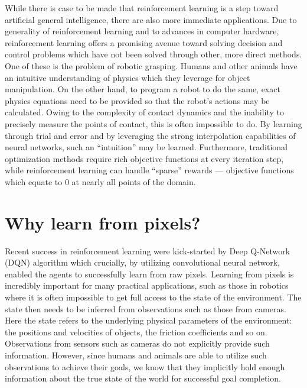 While there is case to be made that reinforcement learning is a step toward
artificial general intelligence, there are also more immediate applications.
Due to generality of reinforcement learning and to advances in computer hardware,
reinforcement learning offers a promising avenue toward solving decision and
control problems which have not been solved through other, more direct methods.
One of these is the problem of robotic grasping.
Humans and other animals have an intuitive understanding of physics which they
leverage for object manipulation.
On the other hand, to program a robot to do the same, exact
physics equations need to be provided so that the robot's actions may be calculated.
Owing to the complexity of contact dynamics and the inability to precisely
measure the points of contact, this is often impossible to do.
By learning through trial and error and by leveraging the strong interpolation
capabilities of neural networks, such an ``intuition'' may be learned.
Furthermore, traditional optimization methods require rich objective functions
at every iteration step, while reinforcement learning can handle ``sparse'' rewards ---
objective functions which equate to 0 at nearly all points of the domain.

\section{Why learn from pixels?}
\label{sec-why-pixels}
Recent success in reinforcement learning were kick-started by Deep Q-Network (DQN) 
algorithm \cite{mnih2013atari} which crucially,
by utilizing convolutional neural network, enabled the agents to successfully learn from raw pixels.
Learning from pixels is incredibly important for many practical applications,
such as those in robotics
where it is often impossible to get full access to the state of the environment.
The state then needs to be inferred from observations such as those from cameras.
Here the state refers to the underlying physical parameters of the environment:
the positions and velocities of objects, the friction coefficients and so on.
Observations from sensors such as cameras do not explicitly provide such information.
However, since humans and animals are able to utilize such observations to achieve their
goals, we know that they implicitly hold enough information about the true state
of the world for successful goal completion.


